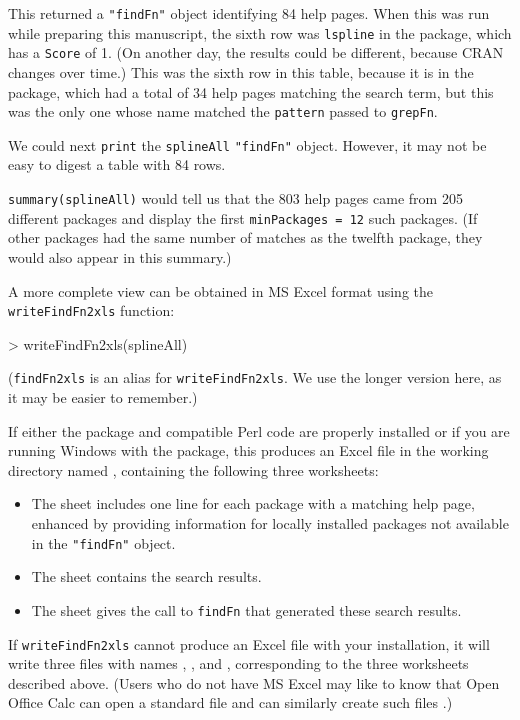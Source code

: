 \documentclass[a4paper]{report}
\begin{document}
\begin{article}
This returned a {\tt "findFn"} object identifying 84 help pages.
When this was
run while preparing this manuscript, the sixth row was
{\tt lspline} in the
 package, which has a {\tt Score} of 1.
(On another day, the results could be different, because
CRAN changes over time.)  This was the sixth row in this
table, because it is in the
 package, which had a total of 34 help
pages matching the search term, but this was the only
one whose name matched the {\tt pattern} passed to {\tt grepFn}.

We could next {\tt print} the {\tt splineAll} {\tt "findFn"}
object.  However, it may not be easy to digest a table
with 84 rows.

{\tt summary(splineAll)} would tell us that the 803  help pages
came from 205 different packages and display the first
{\tt minPackages = 12} such packages.
(If other packages had the same number of
matches as the twelfth package, they would also appear in this
summary.)

A more complete view can be obtained in MS Excel format
using the {\tt writeFindFn2xls} function:

\begin{Schunk}
\begin{Sinput}
> writeFindFn2xls(splineAll)
\end{Sinput}
\end{Schunk}
({\tt findFn2xls} is an alias for {\tt writeFindFn2xls}.
We use the longer version here, as it may be
easier to remember.)

If either the  package and compatible Perl code
are properly installed or if you are running Windows with
the  package, this produces an Excel file in the
working directory named , containing the
following three worksheets:

\begin{itemize}
\item{The  sheet includes one line for each
package with a matching help page, enhanced by providing
information for locally installed packages
not available in the {\tt "findFn"} object.}
\item{The  sheet contains the search results.}
\item{The  sheet gives the call to {\tt findFn}
that generated these search results.}
\end{itemize}

If {\tt writeFindFn2xls} cannot produce an Excel file with
your installation, it will write three  files with
names , , and
, corresponding to the three
worksheets described above. (Users who do not have MS Excel
may like to know that Open Office Calc can open a standard
 file and can similarly create such files
\citep{CALC09MAN}.)


\end{article}
\end{document}
